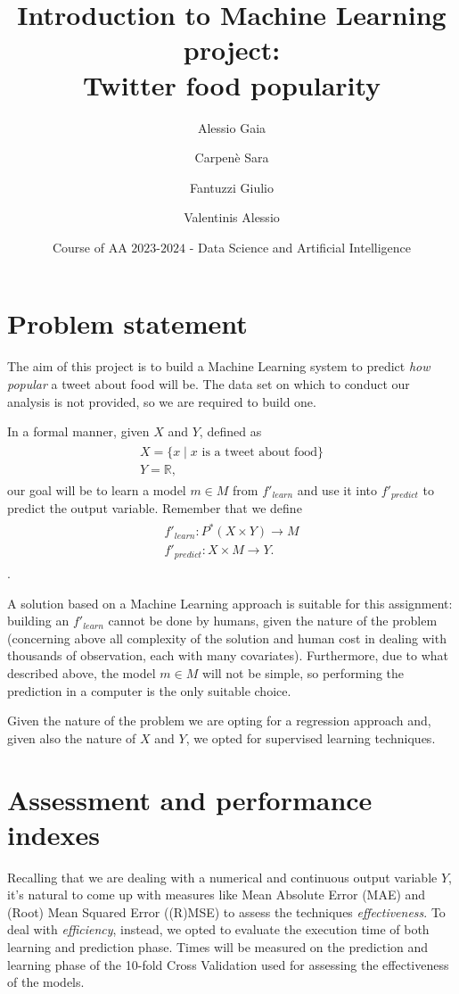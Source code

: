 \documentclass{article}
\title{Introduction to Machine Learning project:\\Twitter food popularity}
\author[1]{Alessio Gaia}
\author[2]{Carpenè Sara}
\author[3]{Fantuzzi Giulio}
\author[4]{Valentinis Alessio}
\affil[1,2,3,4]{
    problem statement,
    solution design,
    solution development,
    data gathering,
    writing
}
\date{Course of AA $2023$-$2024$ - Data Science and Artificial Intelligence}
\begin{document}
\maketitle



\section{Problem statement}
\label{sec:problem_statement}
The aim of this project is to build a Machine Learning system to predict \textit{how popular} a tweet about food will be.
The data set on which to conduct our analysis is not provided, so we are required to build one.

In a formal manner, given $X$ and $Y$, defined as
\begin{align*}
\begin{gathered}
	X = \{x \mid x \text{ is a tweet about food}\}\\
	Y = \mathbb{R},
\end{gathered}
\end{align*}
our goal will be to learn a model $m \in M$ from $f'_{learn}$ and use it into $f'_{predict}$ to predict the output variable.
Remember that we define
\begin{align*}
\begin{gathered}
	f'_{learn}: P^{*}(X \times Y) \rightarrow M\\
	f'_{predict} : X \times M \rightarrow Y.
\end{gathered}
\end{align*}.

A solution based on a Machine Learning approach is suitable for this assignment: building an $f'_{learn}$ cannot be done by humans, given the nature of the problem (concerning above all complexity of the solution and human cost in dealing with thousands of observation, each with many covariates).
Furthermore, due to what described above, the model $m \in M$ will not be simple, so performing the prediction in a computer is the only suitable choice.

Given the nature of the problem we are opting for a regression approach and, given also the nature of $X$ and $Y$, we opted for supervised learning techniques.

\section{Assessment and performance indexes}
\label{sec:assessment_performance_index}
Recalling that we are dealing with a numerical and continuous output variable $Y$, it's natural to come up with measures like Mean Absolute Error (MAE) and (Root) Mean Squared Error ((R)MSE) to assess the techniques \textit{effectiveness}.
To deal with \textit{efficiency}, instead, we opted to evaluate the execution time of both learning and prediction phase. Times will be measured on the prediction and learning phase of the 10-fold Cross Validation used for assessing the effectiveness of the models.
\end{document}
